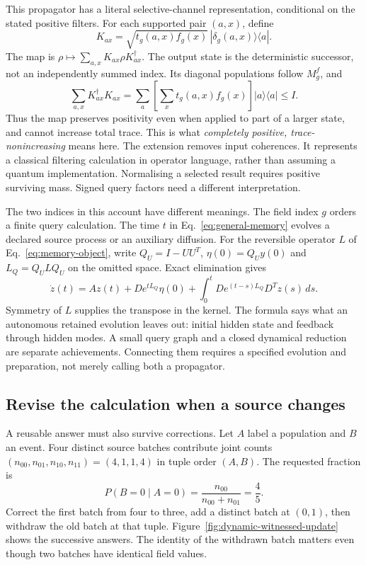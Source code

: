 This propagator has a literal selective-channel representation, conditional on the stated positive filters. For each supported pair $(a,x)$, define
\[
 K_{ax}=\sqrt{t_g(a,x)f_g(x)}\,|\delta_g(a,x)\rangle\langle a|.
\]
The map is $\rho\mapsto\sum_{a,x}K_{ax}\rho K_{ax}^{\dagger}$. The output state is the deterministic successor, not an independently summed index. Its diagonal populations follow $M_g^f$, and
\[
 \sum_{a,x}K_{ax}^{\dagger}K_{ax}
 =\sum_a\left[\sum_x t_g(a,x)f_g(x)\right]|a\rangle\langle a|\leq I .
\]
Thus the map preserves positivity even when applied to part of a larger state, and cannot increase total trace. This is what \emph{completely positive, trace-nonincreasing} means here. The extension removes input coherences. It represents a classical filtering calculation in operator language, rather than assuming a quantum implementation. Normalising a selected result requires positive surviving mass. Signed query factors need a different interpretation.

The two indices in this account have different meanings. The field index $g$ orders a finite query calculation. The time $t$ in Eq.~\eqref{eq:general-memory} evolves a declared source process or an auxiliary diffusion. For the reversible operator $L$ of Eq.~\eqref{eq:memory-object}, write $Q_U=I-UU^T$, $\eta(0)=Q_Uy(0)$ and $L_Q=Q_ULQ_U$ on the omitted space. Exact elimination gives
\begin{equation}
 \dot z(t)=Az(t)+D e^{tL_Q}\eta(0)
 +\int_0^t D e^{(t-s)L_Q}D^Tz(s)\,ds .
 \label{eq:dynamic-reduced-memory}
\end{equation}
Symmetry of $L$ supplies the transpose in the kernel. The formula says what an autonomous retained evolution leaves out: initial hidden state and feedback through hidden modes. A small query graph and a closed dynamical reduction are separate achievements. Connecting them requires a specified evolution and preparation, not merely calling both a propagator.

\subsection{Revise the calculation when a source changes}
\label{subsec:dynamic-updates}

A reusable answer must also survive corrections. Let $A$ label a population and $B$ an event. Four distinct source batches contribute joint counts $(n_{00},n_{01},n_{10},n_{11})=(4,1,1,4)$ in tuple order $(A,B)$. The requested fraction is
\[
 P(B=0\mid A=0)=\frac{n_{00}}{n_{00}+n_{01}}=\frac45.
\]
Correct the first batch from four to three, add a distinct batch at $(0,1)$, then withdraw the old batch at that tuple. Figure~\ref{fig:dynamic-witnessed-update} shows the successive answers. The identity of the withdrawn batch matters even though two batches have identical field values.

